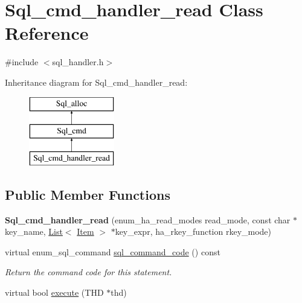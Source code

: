 \hypertarget{classSql__cmd__handler__read}{}\section{Sql\+\_\+cmd\+\_\+handler\+\_\+read Class Reference}
\label{classSql__cmd__handler__read}


{\ttfamily \#include $<$sql\+\_\+handler.\+h$>$}

Inheritance diagram for Sql\+\_\+cmd\+\_\+handler\+\_\+read\+:\begin{figure}[H]
\begin{center}
\leavevmode
\includegraphics[height=3.000000cm]{classSql__cmd__handler__read}
\end{center}
\end{figure}
\subsection*{Public Member Functions}
\begin{DoxyCompactItemize}
\item 
\mbox{\label{classSql__cmd__handler__read_a0c16bed333be61225abe6b54a15a07cf}} 
{\bfseries Sql\+\_\+cmd\+\_\+handler\+\_\+read} (enum\+\_\+ha\+\_\+read\+\_\+modes read\+\_\+mode, const char $\ast$key\+\_\+name, \mbox{\hyperlink{classList}{List}}$<$ \mbox{\hyperlink{classItem}{Item}} $>$ $\ast$key\+\_\+expr, ha\+\_\+rkey\+\_\+function rkey\+\_\+mode)
\item 
\mbox{\label{classSql__cmd__handler__read_a4d360a64eceb8bcb4aff90b2d60fb608}} 
virtual enum\+\_\+sql\+\_\+command \mbox{\hyperlink{classSql__cmd__handler__read_a4d360a64eceb8bcb4aff90b2d60fb608}{sql\+\_\+command\+\_\+code}} () const
\begin{DoxyCompactList}\small\item\em Return the command code for this statement. \end{DoxyCompactList}\item 
virtual bool \mbox{\hyperlink{classSql__cmd__handler__read_ab22e7bb754b8f8a9b6d64af65329ca2c}{execute}} (T\+HD $\ast$thd)
\end{DoxyCompactItemize}
